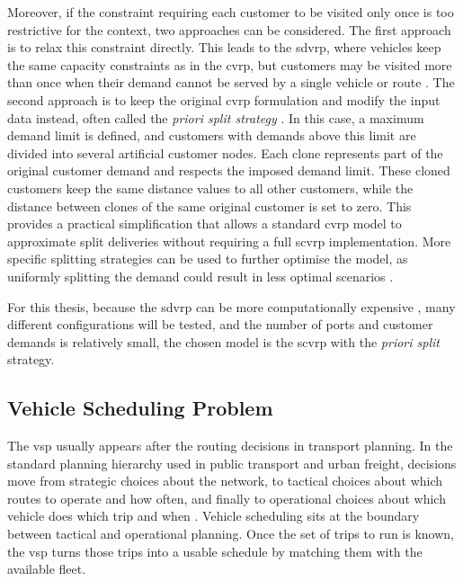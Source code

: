 \documentclass[12pt]{article}
\begin{document}
Moreover, if the constraint requiring each customer to be visited only once is too restrictive for the context, two approaches can be considered. The first approach is to relax this constraint directly. This leads to the \acf{sdvrp}, where vehicles keep the same capacity constraints as in the \ac{cvrp}, but customers may be visited more than once when their demand cannot be served by a single vehicle or route \parencite{ARCHETTI2011741}. The second approach is to keep the original \ac{cvrp} formulation and modify the input data instead, often called the \textit{priori split strategy} \parencite{a17090396}. In this case, a maximum demand limit is defined, and customers with demands above this limit are divided into several artificial customer nodes. Each clone represents part of the original customer demand and respects the imposed demand limit. These cloned customers keep the same distance values to all other customers, while the distance between clones of the same original customer is set to zero. This provides a practical simplification that allows a standard \ac{cvrp} model to approximate split deliveries without requiring a full \ac{scvrp} implementation. More specific splitting strategies can be used to further optimise the model, as uniformly splitting the demand could result in less optimal scenarios \parencite{a17090396}.

For this thesis, because the \ac{sdvrp} can be more computationally expensive \parencite{a17090396}, many different configurations will be tested, and the number of ports and customer demands is relatively small, the chosen model is the \ac{scvrp} with the \textit{priori split} strategy.

\subsection{Vehicle Scheduling Problem}
\label{subsec:vehicle-scheduling-problem}

The \ac{vsp} usually appears after the routing decisions in transport planning. In the standard planning hierarchy used in public transport and urban freight, decisions move from strategic choices about the network, to tactical choices about which routes to operate and how often, and finally to operational choices about which vehicle does which trip and when \parencite{ibarra2015planning}. Vehicle scheduling sits at the boundary between tactical and operational planning. Once the set of trips to run is known, the \ac{vsp} turns those trips into a usable schedule by matching them with the available fleet.
\end{document}
